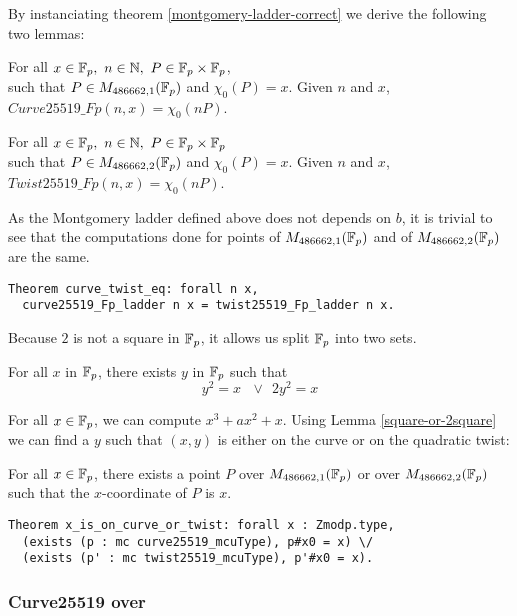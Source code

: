 By instanciating theorem \ref{montgomery-ladder-correct} we derive the following two lemmas:
\begin{lemma} For all $x \in \mathbb{F}_{p},\ n \in \mathbb{N},\ P \in \mathbb{F}_{p} \times \mathbb{F}_{p}$,\\
such that $P \in M_{486662,1}(\mathbb{F}_{p})$ and $\chi_0(P) = x$.
Given $n$ and $x$, $Curve25519\_Fp(n,x) = \chi_0(nP)$.
\end{lemma}
\begin{lemma} For all $x \in \mathbb{F}_{p},\ n \in \mathbb{N},\ P \in \mathbb{F}_{p} \times \mathbb{F}_{p}$\\
such that $P \in M_{486662,2}(\mathbb{F}_{p})$ and $\chi_0(P) = x$.
Given $n$ and $x$, $Twist25519\_Fp(n,x) = \chi_0(nP)$.
\end{lemma}
As the Montgomery ladder defined above does not depends on $b$, it is trivial to see that the computations done for points of $M_{486662,1}(\mathbb{F}_{p})$ and of $M_{486662,2}(\mathbb{F}_{p})$ are the same.
\begin{lstlisting}[language=Coq]
Theorem curve_twist_eq: forall n x,
  curve25519_Fp_ladder n x = twist25519_Fp_ladder n x.
\end{lstlisting}

Because $2$ is not a square in $\mathbb{F}_{p}$, it allows us split $\mathbb{F}_{p}$ into two sets.
\begin{lemma}
\label{square-or-2square}
For all $x$ in $\mathbb{F}_{p}$, there exists $y$ in $\mathbb{F}_{p}$ such that
$$y^2 = x\ \ \ \lor\ \ 2y^2 = x$$
\end{lemma}
For all $x \in \mathbb{F}_{p}$, we can compute $x^3 + ax^2 + x$. Using Lemma \ref{square-or-2square} we can find a $y$ such that $(x,y)$ is either on the curve or on the quadratic twist:
\begin{lemma}
\label{curve-or-twist}
For all $x \in \mathbb{F}_{p}$, there exists a point $P$ over $M_{486662,1}(\mathbb{F}_{p})$ or over $M_{486662,2}(\mathbb{F}_{p})$ such that the $x$-coordinate of $P$ is $x$.
\end{lemma}
\begin{lstlisting}[language=Coq]
Theorem x_is_on_curve_or_twist: forall x : Zmodp.type,
  (exists (p : mc curve25519_mcuType), p#x0 = x) \/
  (exists (p' : mc twist25519_mcuType), p'#x0 = x).
\end{lstlisting}

\subsubsection{Curve25519 over }

